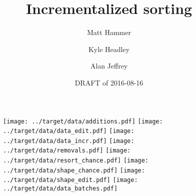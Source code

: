 \documentclass{article}
\title{Incrementalized sorting}
\author{Matt Hammer\and Kyle Headley\and Alan Jeffrey}
\date{DRAFT of 2016-08-16}
\begin{document}
\maketitle

\begin{figure}
  \centering
  \texttt{[image: ../target/data/additions.pdf]}
  \texttt{[image: ../target/data/data\_edit.pdf]}
  \texttt{[image: ../target/data/data\_incr.pdf]}
  \texttt{[image: ../target/data/removals.pdf]}
  \texttt{[image: ../target/data/resort\_chance.pdf]}
  \texttt{[image: ../target/data/shape\_chance.pdf]}
  \texttt{[image: ../target/data/shape\_edit.pdf]}
  \texttt{[image: ../target/data/data\_batches.pdf]}
\end{figure}

\cite{servo}



\end{document}
